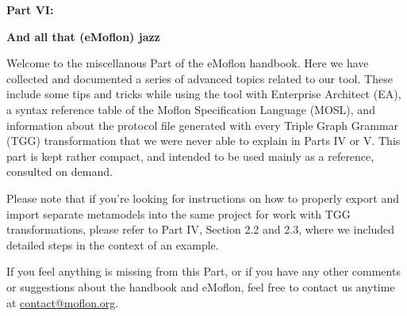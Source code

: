 \vspace*{2cm}

{\bf \huge Part VI:}
\vspace{1cm}

{\Huge \bf And all that (eMoflon) jazz}
\vspace{1cm}

\genHeader

Welcome to the miscellanous Part of the eMoflon handbook. Here we have collected and documented a series of advanced topics related to our tool. These include
some tips and tricks while using the tool with Enterprise Architect (EA), a syntax reference table of the Moflon Specification Language (MOSL), and
information about the protocol file generated with every Triple Graph Grammar (TGG) transformation that we were never able to explain in Parts IV or V. This part is kept
rather compact, and intended to be used mainly as a reference, consulted on demand.

Please note that if you're looking for instructions on how to properly export and import separate metamodels into the same project for work with TGG
transformations, please refer to Part IV, Section 2.2 and 2.3, where we included detailed steps in the context of an example.

If you feel anything is missing from this Part, or if you have any other comments or suggestions about the handbook and eMoflon, feel free to contact us anytime
at \href{mailto:contact@moflon.org}{contact@moflon.org}.
















